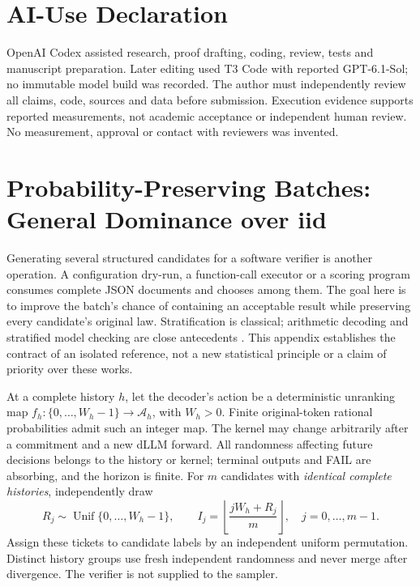 \documentclass[12pt]{article}
\theoremstyle{readable}
\begin{document}
\section*{AI-Use Declaration}
OpenAI Codex assisted research, proof drafting, coding, review, tests and
manuscript preparation. Later editing used T3 Code with reported GPT-6.1-Sol;
no immutable model build was recorded. The author must independently review
all claims, code, sources and data before submission. Execution evidence
supports reported measurements, not academic acceptance or independent human
review. No measurement, approval or contact with reviewers was invented.

\appendix
\section{Probability-Preserving Batches: General Dominance over iid}
\label{sec:batches}

Generating several structured candidates for a software verifier is another
operation. A configuration dry-run, a function-call executor or a scoring
program consumes complete JSON documents and chooses among them. The goal
here is to improve the batch's chance of containing an acceptable result while
preserving every candidate's original law. Stratification is classical;
arithmetic decoding and stratified model checking are close antecedents
\cite{vilnis2023arithmetic,roohi2020stmc}. This appendix establishes the
contract of an isolated reference, not a new statistical principle or a
claim of priority over these works.

At a complete history $h$, let the decoder's action be a deterministic
unranking map $f_h:\{0,\ldots,W_h-1\}\to\mathcal A_h$, with $W_h>0$.
Finite original-token rational probabilities admit such an integer map.
The kernel may change arbitrarily after a commitment and a new dLLM forward.
All randomness affecting future decisions belongs to the history or kernel;
terminal outputs and FAIL are absorbing, and the horizon is finite.
For $m$ candidates with \emph{identical complete histories}, independently draw
\begin{equation}
 R_j\sim\operatorname{Unif}\{0,\ldots,W_h-1\},\qquad
 I_j=\left\lfloor\frac{jW_h+R_j}{m}\right\rfloor,
 \quad j=0,\ldots,m-1.
 \label{eq:batch-tickets}
\end{equation}
Assign these tickets to candidate labels by an independent uniform permutation.
Distinct history groups use fresh independent randomness and never merge
after divergence. The verifier is not supplied to the sampler.
\end{document}
